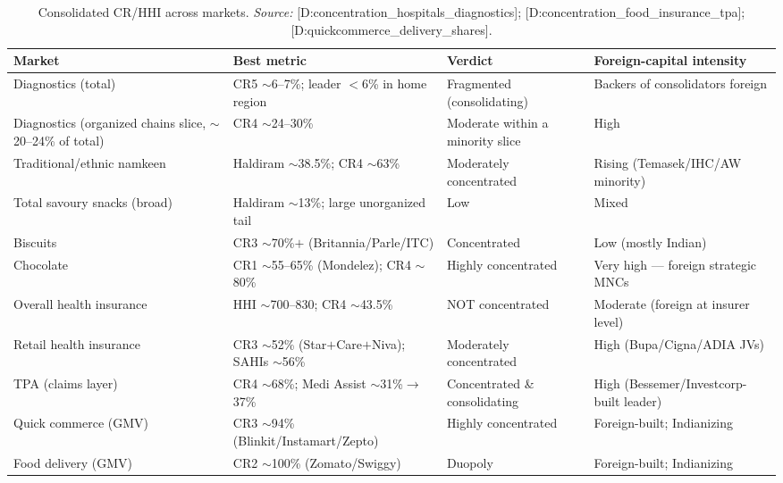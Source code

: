 \documentclass[11pt,a4paper]{article}
\newcommand{\cs}[1]{\textnormal{[#1]}}
\begin{document}
\begin{table}[htbp]
\centering
\small
\setlength{\tabcolsep}{4pt}
\caption{Consolidated CR/HHI across markets. \textit{Source:} \cs{D:concentration\_hospitals\_diagnostics}; \cs{D:concentration\_food\_insurance\_tpa}; \cs{D:quickcommerce\_delivery\_shares}.}
\label{tab:crhhi}
\begin{tabularx}{\textwidth}{@{}>{\raggedright\arraybackslash}p{4.0cm} >{\raggedright\arraybackslash}p{4.3cm} >{\raggedright\arraybackslash}p{3.2cm} >{\raggedright\arraybackslash}X@{}}
\toprule
\textbf{Market} & \textbf{Best metric} & \textbf{Verdict} & \textbf{Foreign-capital intensity} \\
\midrule
Diagnostics (total) & CR5 $\sim$6--7\%; leader $<$6\% in home region & Fragmented (consolidating) & Backers of consolidators foreign \\
Diagnostics (organized chains slice, $\sim$20--24\% of total) & CR4 $\sim$24--30\% & Moderate within a minority slice & High \\
Traditional/ethnic namkeen & Haldiram $\sim$38.5\%; CR4 $\sim$63\% & Moderately concentrated & Rising (Temasek/IHC/AW minority) \\
Total savoury snacks (broad) & Haldiram $\sim$13\%; large unorganized tail & Low & Mixed \\
Biscuits & CR3 $\sim$70\%$+$ (Britannia/Parle/ITC) & Concentrated & Low (mostly Indian) \\
Chocolate & CR1 $\sim$55--65\% (Mondelez); CR4 $\sim$80\% & Highly concentrated & Very high --- foreign strategic MNCs \\
Overall health insurance & HHI $\sim$700--830; CR4 $\sim$43.5\% & NOT concentrated & Moderate (foreign at insurer level) \\
Retail health insurance & CR3 $\sim$52\% (Star$+$Care$+$Niva); SAHIs $\sim$56\% & Moderately concentrated & High (Bupa/Cigna/ADIA JVs) \\
TPA (claims layer) & CR4 $\sim$68\%; Medi Assist $\sim$31\%$\rightarrow$37\% & Concentrated \& consolidating & High (Bessemer/Investcorp-built leader) \\
Quick commerce (GMV) & CR3 $\sim$94\% (Blinkit/Instamart/Zepto) & Highly concentrated & Foreign-built; Indianizing \\
Food delivery (GMV) & CR2 $\sim$100\% (Zomato/Swiggy) & Duopoly & Foreign-built; Indianizing \\
\bottomrule
\end{tabularx}
\end{table}
\end{document}
